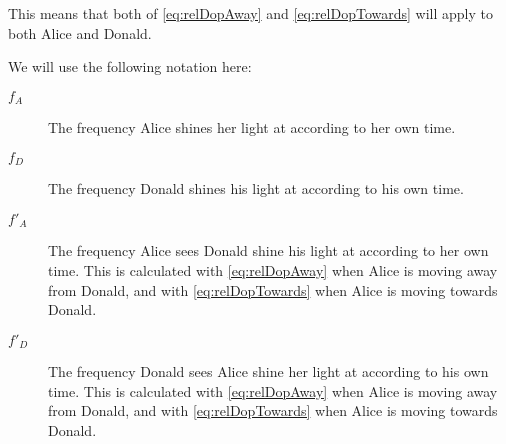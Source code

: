 		This means that both of \eqref{eq:relDopAway} and \eqref{eq:relDopTowards} will apply to both Alice and Donald.

		We will use the following notation here:
		\begin{description}
			\item[$f_A$] The frequency Alice shines her light at according to her own time.
			\item[$f_D$] The frequency Donald shines his light at according to his own time.
			\item[$f'_A$] The frequency Alice sees Donald shine his light at according to her own time. This is calculated with \eqref{eq:relDopAway} when Alice is moving away from Donald, and with \eqref{eq:relDopTowards} when Alice is moving towards Donald.
			\item[$f'_D$] The frequency Donald sees Alice shine her light at according to his own time. This is calculated with \eqref{eq:relDopAway} when Alice is moving away from Donald, and with \eqref{eq:relDopTowards} when Alice is moving towards Donald.
		\end{description}

